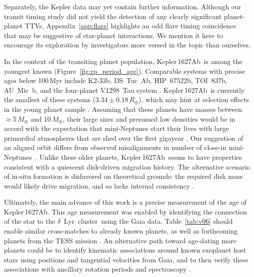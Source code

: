 \documentclass[12pt,modern,twocolumn,tighten]{aastex63}
\newcommand{\cn}{$\delta$\ Lyr\ cluster} %
\newcommand{\pn}{Kepler\,1627Ab} %
\begin{document}
Separately, the Kepler data may yet contain further information.
Although our transit timing study did not yield the detection of any
clearly significant planet-planet TTVs, Appendix~\ref{app:flare}
highlights an odd flare timing coincidence that may be suggestive of
star-planet interactions.  We mention it here to encourage its
exploration by investigators more versed in the topic than ourselves.

In the context of the transiting planet population, \pn\ is among the
youngest known (Figure~\ref{fig:rp_period_age}).  Comparable systems
with precise ages below 100\,Myr include K2-33b, DS~Tuc~Ab,
HIP~67522b, TOI~837b, AU~Mic~b, and the four-planet V1298~Tau system
\citep{Mann_K2_33b_2016,David_et_al_2017,newton_tess_2019,david_four_2019,bouma_cluster_2020,plavchan_planet_2020}.
\pn\ is currently the smallest of these systems ($3.34\pm
0.18\,R_\oplus$), which may hint at selection effects in the young
planet sample \citep{zhou_2021_tois}.  Assuming that these planets
have masses between $\approx$5$\,M_\oplus$ and 10$\,M_\oplus$, their
large sizes and presumed low densities would be in accord with the
expectation that mini-Neptunes start their lives with large primordial
atmospheres that are shed over the first gigayear
\citep{Owen_Wu_2013,Fulton_et_al_2017,ginzburg_corepowered_2018}.  Our
suggestion of an aligned orbit differs from observed misalignments in
number of close-in
mini-Neptunes~\citep{sanchis-ojeda_starspots_2011,albrecht_obliquities_2012,dalal_2019_hd3167,rubenzahl_tess-keck_2021}.
Unlike these older planets, \pn\ seems to have properties consistent
with a quiescent disk-driven migration history.  The alternative
scenario of in-situ formation is disfavored on theoretical grounds:
the required disk mass would likely drive migration, and so lacks
internal consistency
\citep{inamdar_formation_2015,ogihara_reassessment_2015}.

Ultimately, the main advance of this work is a precise measurement of
the age of \pn.   This age measurement was enabled by identifying the
connection of the star to the \cn\ using the Gaia data.
Table~\ref{tab:v06} should enable similar cross-matches to already
known planets, as well as forthcoming planets from the TESS mission
\citep{ricker_transiting_2015,guerrero_tess_2021}.  An alternative
path toward age-dating more planets could be to identify kinematic
associations around known exoplanet host stars using positions and
tangential velocities from Gaia, and to then verify these associations
with ancillary rotation periods and spectroscopy \citep[{\it
e.g.},][]{tofflemire_tess_2021}.
\end{document}
